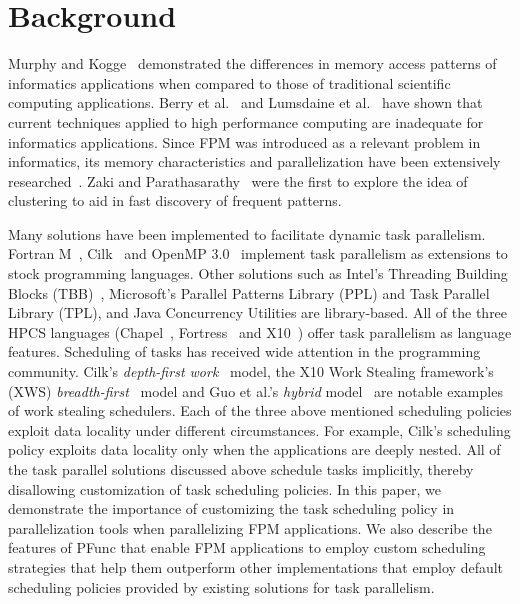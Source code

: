 \documentclass{IOS-Book-Article}
\begin{document}
\section{Background}
\label{sec:back}
Murphy and Kogge~\cite{Kogge:2007} demonstrated the differences in memory
access patterns of informatics applications when compared to those of
traditional scientific computing applications.  Berry et al.~\cite{Berry:2007}
and Lumsdaine et al.~\cite{Lumsdaine:2007} have shown that current techniques
applied to high performance computing are inadequate for informatics
applications.
Since FPM was introduced as a relevant problem in informatics, its memory
characteristics and parallelization have been extensively
researched~\cite{Agrawal:1994, Agrawal:1996, Sam:2000,
Parthasarathy:2001,Buehrer:2006,Nijsen:2004,Wang:2004,Han:2000, Ghoting:2007,
Kim:1998}.  Zaki and Parathasarathy~\cite{Zaki:1997} were the first to explore
the idea of clustering to aid in fast discovery of frequent patterns.  

Many solutions have been implemented to facilitate dynamic task parallelism.
Fortran M~\cite{Foster97}, Cilk~\cite{FrigoLeRa98} and OpenMP
3.0~\cite{kn:omp_30} implement task parallelism as extensions to stock
programming languages. Other solutions such as Intel's Threading Building
Blocks (TBB)~\cite{kn:tbb}, Microsoft's Parallel Patterns Library (PPL) and
Task Parallel Library (TPL), and Java Concurrency Utilities are library-based.
All of the three HPCS languages (Chapel~\cite{Chamberlain:2007p1040},
Fortress~\cite{fortress} and X10~\cite{Charles:2005p1232}) offer task
parallelism as language features. Scheduling of tasks has received wide
attention in the programming community. Cilk's \textit{depth-first
work}~\cite{Blumofe94} model, the X10 Work Stealing framework's (XWS)
\textit{breadth-first}~\cite{Cong08} model and Guo et al.'s \textit{hybrid}
model~\cite{Sarkar09} are notable examples of work stealing schedulers.  Each
of the three above mentioned scheduling policies exploit data locality under
different circumstances. For example, Cilk's scheduling policy exploits data
locality only when the applications are deeply nested. 
All of the task parallel solutions discussed above schedule tasks implicitly,
thereby disallowing customization of task scheduling policies. 
In this paper, we demonstrate the importance of customizing the task scheduling
policy in parallelization tools when parallelizing FPM applications.  We also
describe the features of PFunc that enable FPM applications to employ custom
scheduling strategies that help them outperform other implementations that
employ default scheduling policies provided by existing solutions for task
parallelism.
\end{document}
